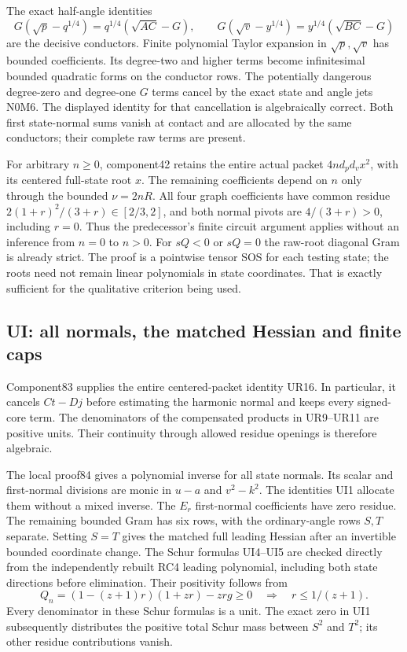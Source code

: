 The exact half-angle identities
\[
 G(\sqrt p-q^{1/4})=q^{1/4}(\sqrt{AC}-G),\qquad
 G(\sqrt v-y^{1/4})=y^{1/4}(\sqrt{BC}-G)
\]
are the decisive conductors. Finite polynomial Taylor expansion in
$\sqrt p,\sqrt v$ has bounded coefficients. Its degree-two and
higher terms become infinitesimal bounded quadratic forms on the
conductor rows. The potentially dangerous degree-zero and degree-one
$G$ terms cancel by the exact state and angle jets N0M6. The displayed
identity for that cancellation is algebraically correct. Both first
state-normal sums vanish at contact and are allocated by the same
conductors; their complete raw terms are present.

For arbitrary $n\ge0$, component42 retains the entire actual packet
$4n d_p d_v x^2$, with its centered full-state root $x$.
The remaining coefficients depend on $n$ only through the bounded
$\nu=2nR$. All four graph coefficients have common residue
$2(1+r)^2/(3+r)\in[2/3,2]$, and both normal pivots are
$4/(3+r)>0$, including $r=0$. Thus the predecessor's finite circuit
argument applies without an inference from $n=0$ to $n>0$.
For $sQ<0$ or $sQ=0$ the raw-root diagonal Gram is already strict.
The proof is a pointwise tensor SOS for each testing state; the roots
need not remain linear polynomials in state coordinates. That is
exactly sufficient for the qualitative criterion being used.

\subsection{UI: all normals, the matched Hessian and finite caps}

Component83 supplies the entire centered-packet identity UR16.
In particular, it cancels $Ct-Dj$ before estimating the harmonic
normal and keeps every signed-core term. The denominators of the
compensated products in UR9--UR11 are positive units. Their continuity
through allowed residue openings is therefore algebraic.

The local proof84 gives a polynomial inverse for all state normals.
Its scalar and first-normal divisions are monic in $u-a$ and
$v^2-k^2$. The identities UI1 allocate them without a mixed inverse.
The $E_r$ first-normal coefficients have zero residue. The remaining
bounded Gram has six rows, with the ordinary-angle rows $S,T$
separate. Setting $S=T$ gives the matched full leading Hessian after
an invertible bounded coordinate change. The Schur formulas UI4--UI5
are checked directly from the independently rebuilt RC4 leading
polynomial, including both state directions before elimination.
Their positivity follows from
\[
 Q_n=(1-(z+1)r)(1+zr)-zr g\ge0
 \quad\Longrightarrow\quad r\le1/(z+1).
\]
Every denominator in these Schur formulas is a unit. The exact zero
in UI1 subsequently distributes the positive total Schur mass between
$S^2$ and $T^2$; its other residue contributions vanish.

